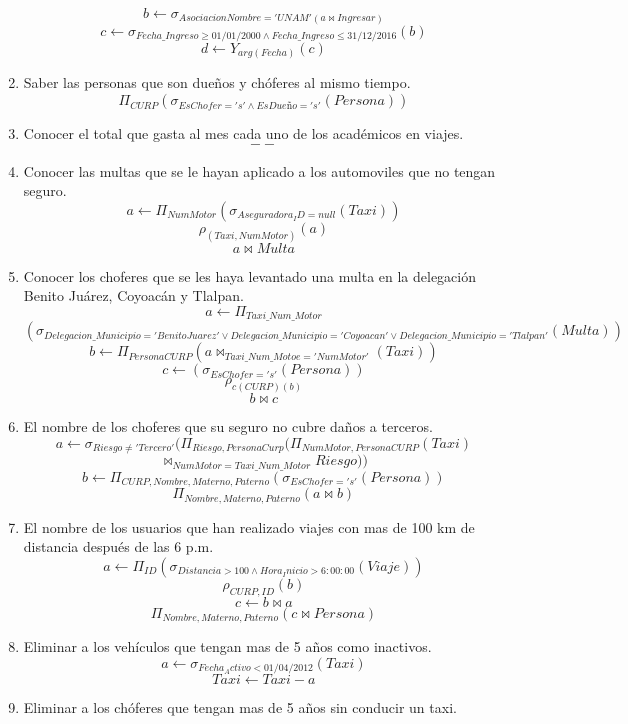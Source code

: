 \documentclass{article}
\begin{document}
\begin{enumerate}
	$$b \leftarrow \sigma _{AsociacionNombre = 'UNAM'(a \bowtie Ingresar)}$$
	$$c \leftarrow \sigma_{Fecha\_Ingreso \geq 01/01/2000 \wedge Fecha\_Ingreso \leq 31/12/2016}(b)$$
	$$d \leftarrow Y_{arg(Fecha)}(c)$$
	\item Saber las personas que son dueños y chóferes al mismo tiempo.\\
	$$\Pi_{CURP}(\sigma_{EsChofer = 's' \wedge EsDueño = 's'}(Persona))$$
	\item Conocer el total que gasta al mes cada uno de los académicos en viajes.\\
	$$--$$
	\item Conocer las multas que se le hayan aplicado a los automoviles que no tengan seguro.\\
	$$a \leftarrow \Pi_{NumMotor}(\sigma_{Aseguradora_ID = null}(Taxi))$$
	$$\rho_{(Taxi,NumMotor)}(a)$$
	$$a \bowtie Multa$$
	\item Conocer los choferes que se les haya levantado una multa en la delegación Benito Juárez, Coyoacán y Tlalpan.\\
	$$a \leftarrow \Pi_{Taxi\_Num\_Motor}$$
	$$(\sigma_{Delegacion\_Municipio = 'Benito Juarez' \vee Delegacion\_Municipio = 'Coyoacan' \vee Delegacion\_Municipio = 'Tlalpan'}(Multa))$$
	$$b \leftarrow \Pi_{PersonaCURP}(a \bowtie _{Taxi\_Num\_Motoe = 'NumMotor'}(Taxi))$$
	$$c \leftarrow (\sigma _{EsChofer='s'}(Persona))$$
	$$\rho _{c(CURP)(b)}$$
	$$b \bowtie c$$
	\item El nombre de los choferes que su seguro no cubre daños a terceros.\\
	$$a \leftarrow \sigma_{Riesgo \neq 'Tercero'}(\Pi_{Riesgo,PersonaCurp}(\Pi_{NumMotor,PersonaCURP}(Taxi)$$
	$$\bowtie_{NumMotor = Taxi\_Num\_Motor}Riesgo))$$
	$$b \leftarrow \Pi_{CURP,Nombre,Materno,Paterno}(\sigma_{EsChofer = 's'}(Persona))$$
	$$\Pi_{Nombre,Materno,Paterno}(a \bowtie b)$$
	\item El nombre de los usuarios que han realizado viajes con mas de 100 km de distancia después de las 6 p.m.\\
	$$a \leftarrow \Pi_{ID}(\sigma _{Distancia > 100 \wedge Hora_Inicio > 6:00:00}(Viaje))$$
	$$\rho_{CURP,ID}(b)$$
	$$c\leftarrow b \bowtie a$$
	$$\Pi _{Nombre,Materno,Paterno}(c \bowtie Persona)$$
	\item Eliminar a los vehículos que tengan mas de 5 años como inactivos.\\
	$$a \leftarrow \sigma _{Fecha_Activo < 01/04/2012}(Taxi)$$
	$$Taxi \leftarrow Taxi - a$$
	\item Eliminar a los chóferes que tengan mas de 5 años sin conducir un taxi.\\

\end{enumerate}
\end{document}
